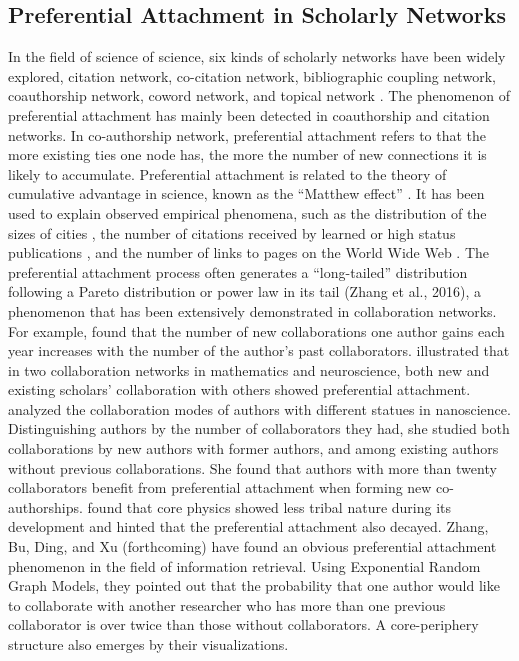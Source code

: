 \documentclass{article}
\begin{document}
\subsection{Preferential Attachment in Scholarly Networks}
In the field of science of science, six kinds of scholarly networks have been widely explored, citation network, co-citation network, bibliographic coupling network, coauthorship network, coword network, and topical network \cite{yan2012scholarly}. The phenomenon of preferential attachment has mainly been detected in coauthorship and citation networks. In co-authorship network, preferential attachment refers to that the more existing ties one node has, the more the number of new connections it is likely to accumulate. Preferential attachment is related to the theory of cumulative advantage in science, known as the “Matthew effect” \cite{merton1968matthew}\cite{price1976general}. It has been used to explain observed empirical phenomena, such as the distribution of the sizes of cities \cite{simon1955class}, the number of citations received by learned or high status publications \cite{price1976general}, and the number of links to pages on the World Wide Web \cite{barabasi1999mean}. The preferential attachment process often generates a “long-tailed” distribution following a Pareto distribution or power law in its tail (Zhang et al., 2016), a phenomenon that has been extensively demonstrated in collaboration networks. For example, \cite{newman2001clustering} found that the number of new collaborations one author gains each year increases with the number of the author’s past collaborators. \cite{barabasi2002evolution} illustrated that in two collaboration networks in mathematics and neuroscience, both new and existing scholars’ collaboration with others showed preferential attachment. \cite{milojevic2010modes} analyzed the collaboration modes of authors with different statues in nanoscience. Distinguishing authors by the number of collaborators they had, she studied both collaborations by new authors with former authors, and among existing authors without previous collaborations. She found that authors with more than twenty collaborators benefit from preferential attachment when forming new co-authorships. \cite{sinatra2015century} found that core physics showed less tribal nature during its development and hinted that the preferential attachment also decayed. Zhang, Bu, Ding, and Xu (forthcoming) have found an obvious preferential attachment phenomenon in the field of information retrieval. Using Exponential Random Graph Models, they pointed out that the probability that one author would like to collaborate with another researcher who has more than one previous collaborator is over twice than those without collaborators. A core-periphery structure also emerges by their visualizations.  
\end{document}
